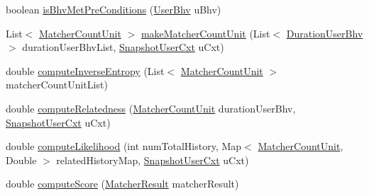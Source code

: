 \begin{DoxyCompactItemize}
\item 
boolean \hyperlink{classlab_1_1davidahn_1_1appshuttle_1_1predict_1_1matcher_1_1recent_1_1_recent_matcher_a9d0185046223ca45ec3d05e8b7e092d0}{is\-Bhv\-Met\-Pre\-Conditions} (\hyperlink{interfacelab_1_1davidahn_1_1appshuttle_1_1collect_1_1bhv_1_1_user_bhv}{\-User\-Bhv} u\-Bhv)
\item 
\-List$<$ \hyperlink{classlab_1_1davidahn_1_1appshuttle_1_1predict_1_1matcher_1_1_matcher_count_unit}{\-Matcher\-Count\-Unit} $>$ \hyperlink{classlab_1_1davidahn_1_1appshuttle_1_1predict_1_1matcher_1_1recent_1_1_recent_matcher_accc572e2dc9345944e68fd5101776773}{make\-Matcher\-Count\-Unit} (\-List$<$ \hyperlink{classlab_1_1davidahn_1_1appshuttle_1_1collect_1_1bhv_1_1_duration_user_bhv}{\-Duration\-User\-Bhv} $>$ duration\-User\-Bhv\-List, \hyperlink{classlab_1_1davidahn_1_1appshuttle_1_1collect_1_1_snapshot_user_cxt}{\-Snapshot\-User\-Cxt} u\-Cxt)
\item 
double \hyperlink{classlab_1_1davidahn_1_1appshuttle_1_1predict_1_1matcher_1_1recent_1_1_recent_matcher_a23de81e5872d8e1792e0ea6c94fd7a1d}{compute\-Inverse\-Entropy} (\-List$<$ \hyperlink{classlab_1_1davidahn_1_1appshuttle_1_1predict_1_1matcher_1_1_matcher_count_unit}{\-Matcher\-Count\-Unit} $>$ matcher\-Count\-Unit\-List)
\item 
double \hyperlink{classlab_1_1davidahn_1_1appshuttle_1_1predict_1_1matcher_1_1recent_1_1_recent_matcher_adf16bf8e219f2991ef62fbc139fab207}{compute\-Relatedness} (\hyperlink{classlab_1_1davidahn_1_1appshuttle_1_1predict_1_1matcher_1_1_matcher_count_unit}{\-Matcher\-Count\-Unit} duration\-User\-Bhv, \hyperlink{classlab_1_1davidahn_1_1appshuttle_1_1collect_1_1_snapshot_user_cxt}{\-Snapshot\-User\-Cxt} u\-Cxt)
\item 
double \hyperlink{classlab_1_1davidahn_1_1appshuttle_1_1predict_1_1matcher_1_1recent_1_1_recent_matcher_aa25520a368cc26b9e873c28984cef590}{compute\-Likelihood} (int num\-Total\-History, \-Map$<$ \hyperlink{classlab_1_1davidahn_1_1appshuttle_1_1predict_1_1matcher_1_1_matcher_count_unit}{\-Matcher\-Count\-Unit}, \-Double $>$ related\-History\-Map, \hyperlink{classlab_1_1davidahn_1_1appshuttle_1_1collect_1_1_snapshot_user_cxt}{\-Snapshot\-User\-Cxt} u\-Cxt)
\item 
double \hyperlink{classlab_1_1davidahn_1_1appshuttle_1_1predict_1_1matcher_1_1recent_1_1_recent_matcher_aa9a3097a4aa951cfba62693d43d14284}{compute\-Score} (\hyperlink{classlab_1_1davidahn_1_1appshuttle_1_1predict_1_1matcher_1_1_matcher_result}{\-Matcher\-Result} matcher\-Result)
\end{DoxyCompactItemize}


